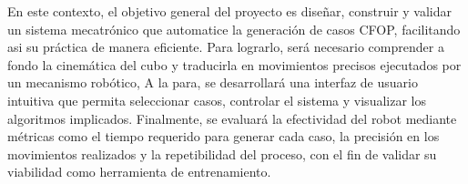 En este contexto, el objetivo general del proyecto es diseñar, construir y validar un sistema mecatrónico que automatice la generación de casos CFOP, facilitando asi su práctica de manera eficiente. Para lograrlo, será necesario comprender a fondo la cinemática del cubo y traducirla en movimientos precisos ejecutados por un mecanismo robótico, A la para, se desarrollará una interfaz de usuario intuitiva que permita seleccionar casos, controlar el sistema y visualizar los algoritmos implicados. Finalmente, se evaluará la efectividad del robot mediante métricas como el tiempo requerido para generar cada caso, la precisión en los movimientos realizados y la repetibilidad del proceso, con el fin de validar su viabilidad como herramienta de entrenamiento. 
